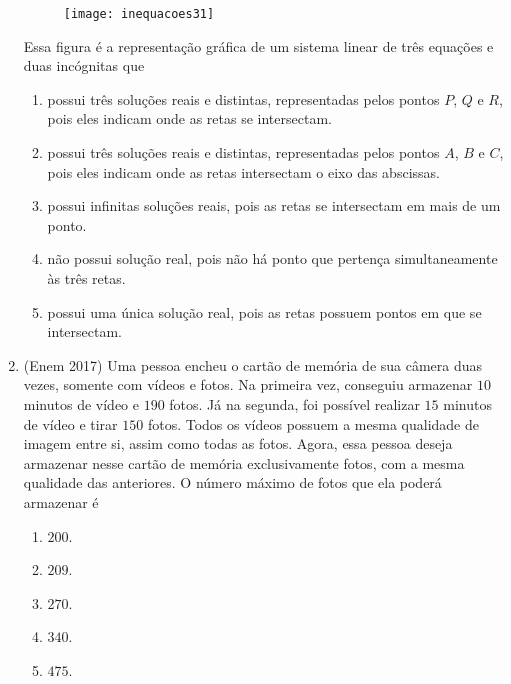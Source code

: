 \begin{enumerate}
\begin{figure}[H]
\centering

\texttt{[image: inequacoes31]}
\end{figure}


Essa figura é a representação gráfica de um sistema linear de três equações e duas incógnitas que
\begin{enumerate}
\item possui três soluções reais e distintas, representadas pelos pontos $P$, $Q$ e $R$, pois eles indicam onde as retas se intersectam.
\item possui três soluções reais e distintas, representadas pelos pontos $A$, $B$ e $C$, pois eles indicam onde as retas intersectam o eixo das abscissas.
\item possui infinitas soluções reais, pois as retas se intersectam em mais de um ponto.
\item não possui solução real, pois não há ponto que pertença simultaneamente às três retas.
\item possui uma única solução real, pois as retas possuem pontos em que se intersectam.
\end{enumerate}

\item (Enem 2017) Uma pessoa encheu o cartão de memória de sua câmera duas vezes, somente com vídeos e fotos. Na primeira vez, conseguiu armazenar $10$ minutos de vídeo e $190$ fotos. Já na segunda, foi possível realizar $15$ minutos de vídeo e tirar $150$ fotos. Todos os vídeos possuem a mesma qualidade de imagem entre si, assim como todas as fotos. Agora, essa pessoa deseja armazenar nesse cartão de memória exclusivamente fotos, com a mesma qualidade das anteriores.
O número máximo de fotos que ela poderá armazenar é
\begin{enumerate}
\item $200$.
\item $209$.
\item $270$.
\item $340$.
\item $475$.
\end{enumerate}


\end{enumerate}

